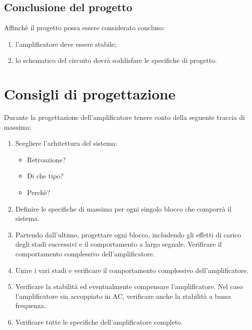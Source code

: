   \subsection{Conclusione del progetto}
  Affinch\`e il progetto possa essere considerato concluso:
  \begin{enumerate} 
    \item l'amplificatore deve essere stabile;
    \item lo schematico del circuito dovr\`a soddisfare le specifiche di
      progetto.
  \end{enumerate}
\section{Consigli di progettazione}
  Durante la progettazione dell'amplificatore tenere conto della seguente
  traccia di massima:
  \begin{enumerate}
    \item Scegliere l'arhitettura del sistema:
      \begin{itemize}
	\item Retroazione?
	\item Di che tipo?
	\item Perch\`e?
      \end{itemize}
    \item Definire le specifiche di massima per ogni singolo blocco che
      comporr\`a il sistema.
    \item Partendo dall'ultimo, progettare ogni blocco, includendo gli effetti
      di carico degli stadi successivi e il comportamento a largo segnale.
      Verificare il comportamento complessivo dell'amplificatore.
    \item Unire i vari stadi e verificare il comportamento complessivo
      dell'amplificatore.
    \item Verificare la stabilit\`a ed eventualmente compensare l'amplificatore.
      Nel caso l'amplificatore sia accoppiato in AC, verificare anche la
      stabilit\`a a bassa frequenza.
    \item Verificare tutte le specifiche dell'amplificatore completo.
  \end{enumerate}



\clearpage
